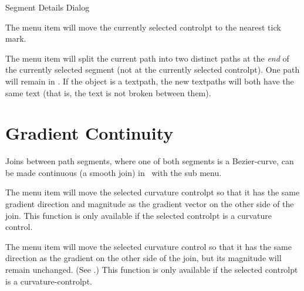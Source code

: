 {}
{Segment Details Dialog}


The  menu item will
move the currently selected \gls*{controlpt} to the nearest
tick mark.


The  menu item will split the current path
into two distinct \glspl{path} at the \emph{end} of the currently
selected segment (not at the currently selected \gls*{controlpt}).
One path will remain in \editpathmode. 
If the object is a \gls*{textpath}, the new \glspl*{textpath} will
both have the same text (that is, the text is not broken between
them).


\section{Gradient Continuity}\label{sec:continous}

Joins between \gls{path} segments, where one of both segments is a
\gls{Bezier-curve}, can be made continuous (a smooth join)
in \editpathmode\ with the  sub menu.


The  menu item will move the selected
curvature \gls*{controlpt} so that it has the same gradient
direction and magnitude as the gradient vector on the other side of
the join.
This function is only available if the selected \gls{controlpt} is
a curvature control.


The  menu item will move the
selected curvature control so that it has the same direction as the
gradient on the other side of the join, but its magnitude will
remain unchanged. (See .)
This function is only available if the selected \gls{controlpt} is
a \gls{curvature-controlpt}.


